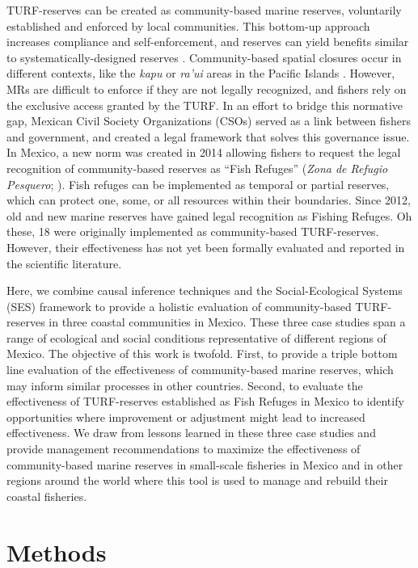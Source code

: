 \documentclass{frontiersSCNS}
\begin{document}
TURF-reserves can be created as community-based marine reserves,
voluntarily established and enforced by local communities. This
bottom-up approach increases compliance and self-enforcement, and
reserves can yield benefits similar to systematically-designed reserves
\citep{gelcich_2015-Gw,espinosaromero_2014-PY,beger_2004-Y8,smallhornwest_2018}.
Community-based spatial closures occur in different contexts, like the
\emph{kapu} or \emph{ra'ui} areas in the Pacific Islands
\citep{bohnsack_2004,johannes_2002}. However, MRs are difficult to
enforce if they are not legally recognized, and fishers rely on the
exclusive access granted by the TURF. In an effort to bridge this
normative gap, Mexican Civil Society Organizations (CSOs) served as a
link between fishers and government, and created a legal framework that
solves this governance issue. In Mexico, a new norm was created in 2014
allowing fishers to request the legal recognition of community-based
reserves as ``Fish Refuges'' (\emph{Zona de Refugio Pesquero};
\citet{nom}). Fish refuges can be implemented as temporal or partial
reserves, which can protect one, some, or all resources within their
boundaries. Since 2012, old and new marine reserves have gained legal
recognition as Fishing Refuges. Oh these, 18 were originally implemented
as community-based TURF-reserves. However, their effectiveness has not
yet been formally evaluated and reported in the scientific literature.

Here, we combine causal inference techniques and the Social-Ecological
Systems (SES) framework to provide a holistic evaluation of
community-based TURF-reserves in three coastal communities in Mexico.
These three case studies span a range of ecological and social
conditions representative of different regions of Mexico. The objective
of this work is twofold. First, to provide a triple bottom line
evaluation of the effectiveness of community-based marine reserves,
which may inform similar processes in other countries. Second, to
evaluate the effectiveness of TURF-reserves established as Fish Refuges
in Mexico to identify opportunities where improvement or adjustment
might lead to increased effectiveness. We draw from lessons learned in
these three case studies and provide management recommendations to
maximize the effectiveness of community-based marine reserves in
small-scale fisheries in Mexico and in other regions around the world
where this tool is used to manage and rebuild their coastal fisheries.

\hypertarget{methods}{%
\section{Methods}\label{methods}}
\end{document}
